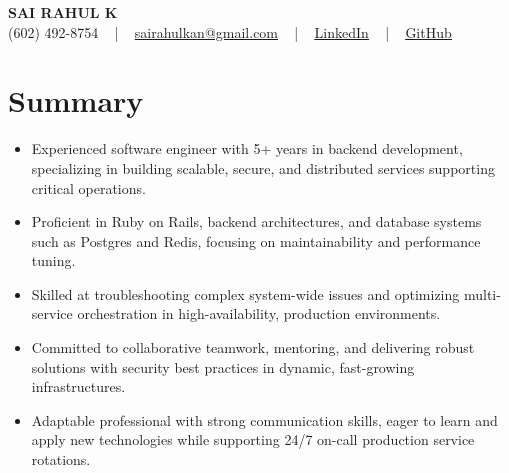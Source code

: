 \documentclass[letterpaper,11pt]{article}
\newcommand{\resumeItem}[1]{
  \item\footnotesize{
    {#1 \vspace{-2pt}}
  }
}
\newcommand{\resumeItemListStart}{\begin{itemize}[leftmargin=*]}
\newcommand{\resumeItemListEnd}{\end{itemize}\vspace{-5pt}}
\begin{document}
\begin{center}
    {\fontsize{14pt}{12pt}\selectfont \textbf{\MakeUppercase{Sai Rahul K}}}\\ \vspace{2pt}
    \fontsize{10pt}{12pt}\selectfont (602) 492-8754 ~ | ~ \href{mailto:sairahulkan@gmail.com}{sairahulkan@gmail.com} ~ | ~
    \href{https://www.linkedin.com/in/rq123/}{\color{blue}\underline{LinkedIn}} ~ | ~
    \href{https://github.com/kanrahuldo}{\color{blue}\underline{GitHub}}~
    \vspace{-8pt}
\end{center}

\section{Summary}
\fontsize{9pt}{10pt}\selectfont
\resumeItemListStart
    \resumeItem{Experienced software engineer with 5+ years in backend development, specializing in building scalable, secure, and distributed services supporting critical operations.}
    \resumeItem{Proficient in Ruby on Rails, backend architectures, and database systems such as Postgres and Redis, focusing on maintainability and performance tuning.}
    \resumeItem{Skilled at troubleshooting complex system-wide issues and optimizing multi-service orchestration in high-availability, production environments.}
    \resumeItem{Committed to collaborative teamwork, mentoring, and delivering robust solutions with security best practices in dynamic, fast-growing infrastructures.}
    \resumeItem{Adaptable professional with strong communication skills, eager to learn and apply new technologies while supporting 24/7 on-call production service rotations.}
\resumeItemListEnd
\vspace{-6pt}
\end{document}
